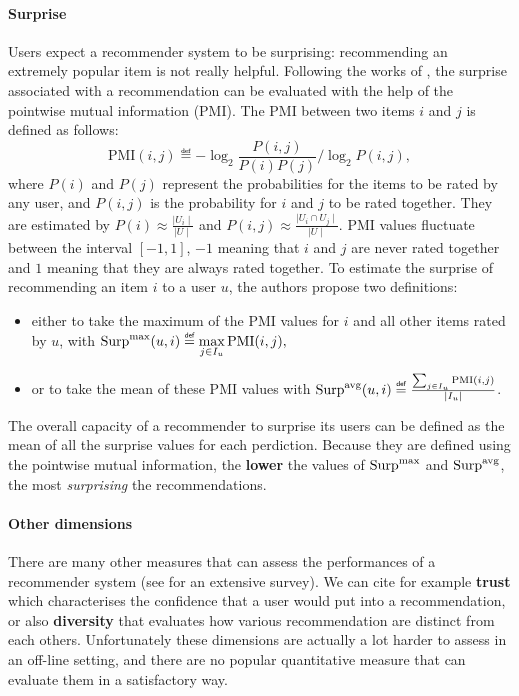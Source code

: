 \paragraph{Surprise\\}
Users expect a recommender system to be surprising: recommending an extremely
popular item is not really helpful. Following the works of
\cite{KamBriRecSys2014}, the surprise associated with a recommendation can be evaluated with
the help of the pointwise mutual information (PMI). The PMI between two items
$i$ and $j$ is defined as follows:
$$\text{PMI}(i, j) \eqdef -\log_2 \frac{P(i, j)}{P(i)P(j)} / \log_2 P(i, j),$$
where $P(i)$ and $P(j)$  represent the probabilities for the items to be rated
by any user, and $P(i, j)$ is the probability for $i$ and $j$ to be rated
together. They are estimated by $P(i) \approx \frac{\mid U_i \mid}{\mid U
\mid}$ and $P(i, j) \approx \frac{\mid U_i \cap U_j \mid}{\mid U\mid}$. PMI
values fluctuate between the interval $[-1, 1]$, $-1$ meaning that $i$ and $j$
are never rated together and $1$ meaning that they are always rated together.
To estimate the surprise of recommending an item $i$ to a user $u$, the authors
propose two definitions:
\begin{itemize}
\item either to take the maximum of the PMI values for $i$ and all other items
  rated by $u$, with $\surpmax(u, i) \eqdef \max\limits_{j\in I_u}
    \text{PMI}(i, j),$
\item
 or to take the mean of these PMI values with $\surpavg(u, i) \eqdef
    \frac{\sum_{j \in I_u} \text{PMI}(i, j)}{\mid I_u\mid }$.
\end{itemize}

The overall capacity of a recommender to surprise its users can be defined as
the mean of all the surprise values for each perdiction. Because they are
defined using the pointwise mutual information, the \textbf{lower} the values
of $\text{Surp}^{\text{max}}$ and $\text{Surp}^{\text{avg}}$, the most \textit{surprising} the recommendations.


\paragraph{Other dimensions\\}

There are  many other measures that can assess the performances of a
recommender system (see \cite{ShaGun11} for an extensive survey). We can cite
for example \textbf{trust} which characterises the confidence that a user would
put into a recommendation, or also \textbf{diversity} that evaluates how
various recommendation are distinct from each others.  Unfortunately these
dimensions are actually a lot harder to assess in an off-line setting, and
there are no popular quantitative measure that can evaluate them in a
satisfactory way.


